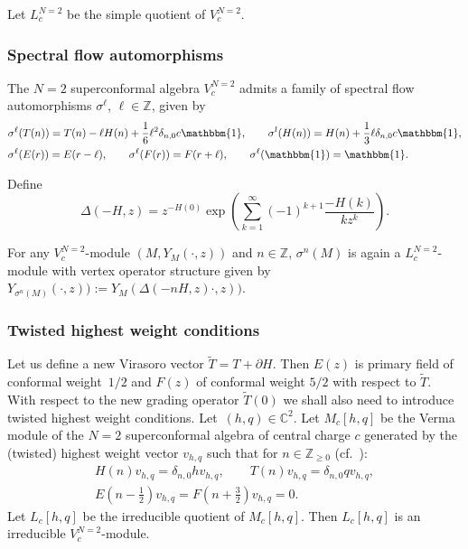 \documentclass[11pt]{article}
\numberwithin{equation}{section}
\newcommand{\Z}{\mathbb Z}
\newcommand{\C}{\mathbb C}
\begin{document}
 Let $L^{N=2}_{c}$ be the simple quotient of $V^{N=2}_{c}$.

\subsubsection{Spectral flow automorphisms}
The $N=2$ superconformal algebra $V^{N=2}_{c}$ admits a family of spectral flow automorphisms $\sigma^\ell$, $\ell \in \mathbb{Z}$, given by
\begin{align*}
\begin{aligned}
	& \sigma^\ell(T(n))= T(n) -\ell H(n) + \frac{1}{6}\ell ^2\delta_{n,0}c\mathbbm{1}, \qquad \sigma^l(H(n)) = H(n) + \frac{1}{3}\ell \delta_{n,0}c\mathbbm{1},  \\
	& \sigma^\ell(E(r))= E({r-\ell}), \qquad \sigma^\ell(F(r)) = F({r+\ell}), \qquad \sigma^\ell(\mathbbm{1}) = \mathbbm{1}.
\end{aligned}
\end{align*}



Define
\[
 \Delta (-H,z) = z^{-H(0)}\exp \left ( \sum _{k=1} ^{\infty} (-1)^{k+1}\frac{-H(k) }{kz^k}\right ).
 \]

For any $V^{N=2}_{c}$-module $(M, Y_M(\cdot, z))$ and $n \in \mathbb{Z}$,
$\sigma^ n (M)$ is again a $L^{N=2}_{c}$-module with vertex operator structure given by
$ Y_{\sigma ^n (M) } ( \cdot , z)) := Y_{ M } (\Delta ( -n H, z) \cdot , z))$.

\subsubsection{Twisted highest weight conditions}
Let us define a new Virasoro vector $\widetilde T = T + \partial H$. Then $E(z)$ is primary field of conformal weight~$1/2$ and $F(z)$ of conformal weight $5/2$ with respect to $\widetilde T$.
 With respect to the new grading operator $\widetilde T(0)$ we shall also need to introduce twisted highest weight conditions.
 Let~${(h,q) \in {\C}^2}$. Let $M_c[h,q]$ be the Verma module of the $N=2$ superconformal algebra of central charge $c$ generated by the (twisted) highest weight vector $v_{h,q}$ such that for $n \in {\Z}_{\ge 0}$ (cf.\ \cite{FST}):
\begin{gather*}
 H(n) v_{h,q} =\delta_{n, 0} h v_{h,q}, \qquad T(n) v_{h,q} = \delta_{n,0} q v_{h,q}, \\ E\left(n-\frac{1}{2}\right) v_{h,q} = F\left(n+\frac{3}{2}\right) v_{h,q} =0.
 \end{gather*}
 Let $L_c[h,q]$ be the irreducible quotient of $M_c[h,q]$. Then $L_c[h,q]$ is an irreducible $V_c^{N=2}$-module.
\end{document}
